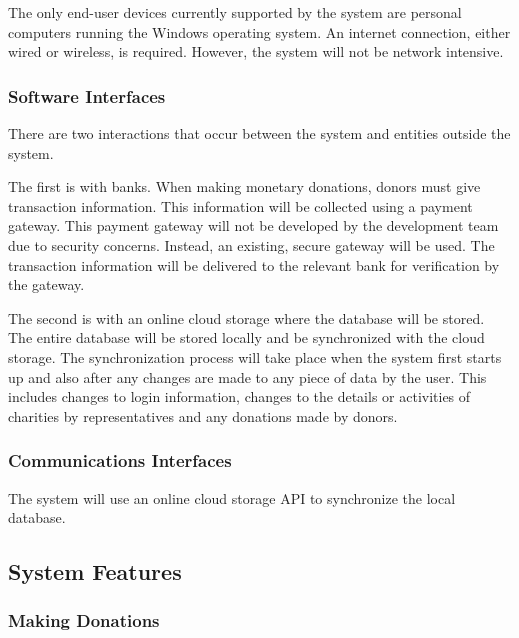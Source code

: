 \documentclass{scrreprt}
\begin{document}
            The only end-user devices currently supported by the system are personal computers running the Windows operating system. An internet connection, either wired or wireless, is required. However, the system will not be network intensive.
            
            \subsubsection{Software Interfaces}
            
            There are two interactions that occur between the system and entities outside the system.\par
            
            
            The first is with banks. When making monetary donations, donors must give transaction information. This information will be collected using a payment gateway. This payment gateway will not be developed by the development team due to security concerns. Instead, an existing, secure gateway will be used. The transaction information will be delivered to the relevant bank for verification by the gateway.\par
            
            The second is with an online cloud storage where the database will be stored. The entire database will be stored locally and be synchronized with the cloud storage. The synchronization process will take place when the system first starts up and also after any changes are made to any piece of data by the user. This includes changes to login information, changes to the details or activities of charities by representatives and any donations made by donors.
            
            \subsubsection{Communications Interfaces}
            
            The system will use an online cloud storage API to synchronize the local database.
            
        \subsection{System Features}
        
            \subsubsection{Making Donations}
            
\end{document}

